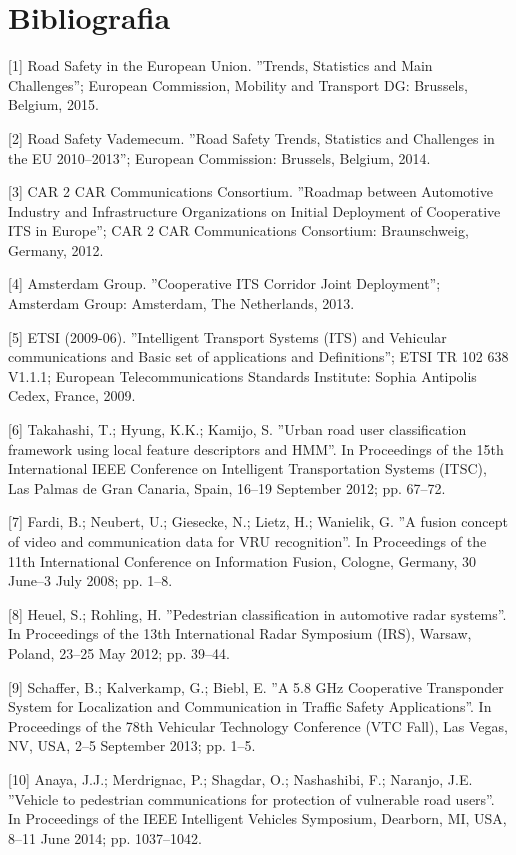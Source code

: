 \chapter{Bibliografia}
[1] Road Safety in the European Union. ''Trends, Statistics and Main
Challenges''; European Commission, Mobility and Transport DG: Brussels,
Belgium, 2015.

[2] Road Safety Vademecum. ''Road Safety Trends, Statistics and Challenges in
the EU 2010–2013''; European Commission: Brussels, Belgium, 2014.

[3] CAR 2 CAR Communications Consortium. ''Roadmap between Automotive Industry
and Infrastructure Organizations on Initial Deployment of Cooperative ITS in
Europe''; CAR 2 CAR Communications Consortium: Braunschweig, Germany, 2012.

[4] Amsterdam Group. ''Cooperative ITS Corridor Joint Deployment''; Amsterdam
Group: Amsterdam, The Netherlands, 2013.

[5] ETSI (2009-06). ''Intelligent Transport Systems (ITS) and Vehicular
communications and Basic set of applications and Definitions''; ETSI TR 102
638 V1.1.1; European Telecommunications Standards Institute: Sophia Antipolis
Cedex, France, 2009.

[6] Takahashi, T.; Hyung, K.K.; Kamijo, S. ''Urban road user classification
framework using local feature descriptors and HMM''. In Proceedings of the 15th
International IEEE Conference on Intelligent Transportation Systems (ITSC), Las
Palmas de Gran Canaria, Spain, 16–19 September 2012; pp. 67–72.

[7] Fardi, B.; Neubert, U.; Giesecke, N.; Lietz, H.; Wanielik, G. ''A fusion
concept of video and communication data for VRU recognition''. In Proceedings
of the 11th International Conference on Information Fusion, Cologne, Germany,
30 June–3 July 2008; pp. 1–8.

[8] Heuel, S.; Rohling, H. ''Pedestrian classification in automotive radar
systems''. In Proceedings of the 13th International Radar Symposium (IRS),
Warsaw, Poland, 23–25 May 2012; pp. 39–44.

[9] Schaffer, B.; Kalverkamp, G.; Biebl, E. ''A 5.8 GHz Cooperative Transponder
System for Localization and Communication in Traffic Safety Applications''. In
Proceedings of the 78th Vehicular Technology Conference (VTC Fall), Las Vegas,
NV, USA, 2–5 September 2013; pp. 1–5.

[10] Anaya, J.J.; Merdrignac, P.; Shagdar, O.; Nashashibi, F.; Naranjo, J.E.
''Vehicle to pedestrian communications for protection of vulnerable road
users''. In Proceedings of the IEEE Intelligent Vehicles Symposium, Dearborn,
MI, USA, 8–11 June 2014; pp. 1037–1042.

